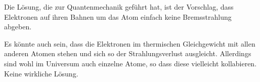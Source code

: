 Die Lösung, die zur Quantenmechanik geführt hat, ist der Vorschlag, dass
Elektronen auf ihren Bahnen um das Atom einfach keine Bremsstrahlung abgeben.

Es könnte auch sein, dass die Elektronen im thermischen Gleichgewicht mit allen
anderen Atomen stehen und sich so der Strahlungsverlust ausgleicht. Allerdings
sind wohl im Universum auch einzelne Atome, so dass diese vielleicht
kollabieren. Keine wirkliche Lösung.


\IfFileExists{\bibliographyfile}{
	
}{}



